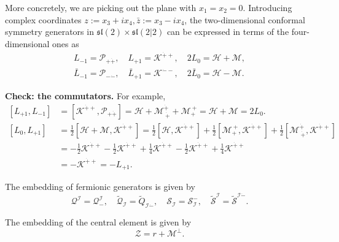 \documentclass[a4paper,11pt]{article}
\begin{document}
More concretely, we are picking out the plane with $x_1 = x_2 = 0$. Introducing complex coordinates $z := x_3 + i x_4, \bar{z} := x_3 - i x_4$, the two-dimensional conformal symmetry generators in $\mathfrak{sl}(2) \times \mathfrak{sl}(2|2)$ can be expressed in terms of the four-dimensional ones as
\begin{equation}
\begin{aligned}
    L_{-1} = \mathcal{P}_{+\dot{+}}, \quad L_{+1} = \mathcal{K}^{\dot{+}+}, \quad2 L_0 = \mathcal{H} + \mathcal{M},\\
    \bar{L}_{-1} = \mathcal{P}_{-\dot{-}}, \quad \bar{L}_{+1} = \mathcal{K}^{\dot{-}-}, \quad 2 \bar{L}_0 = \mathcal{H} - \mathcal{M}.
\end{aligned}
\end{equation}

\noindent \textbf{Check: the commutators.} For example,
\begin{equation}
\begin{aligned}
    [L_{+1}, L_{-1}] &= [\mathcal{K}^{\dot{+}+}, \mathcal{P}_{+\dot{+}}] = \mathcal{H} + \mathcal{M}^{\dot{+}}_{~ \dot{+}} + \mathcal{M}_+^{~+} = \mathcal{H} + \mathcal{M} = 2L_0.\\
    [L_0, L_{+ 1}] &= \frac{1}{2} [\mathcal{H} + \mathcal{M}, \mathcal{K}^{\dot{+}+}] = \frac{1}{2} [\mathcal{H}, \mathcal{K}^{\dot{+}+}] + \frac{1}{2}[\mathcal{M}_+^{~+}, \mathcal{K}^{\dot{+}+}] + \frac{1}{2}[\mathcal{M}^{\dot{+}}_{~\dot{+}}, \mathcal{K}^{\dot{+}+}]\\
    &= - \frac{1}{2} \mathcal{K}^{\dot{+}+} - \frac{1}{2} \mathcal{K}^{\dot{+}+} + \frac{1}{4}\mathcal{K}^{\dot{+}+} - \frac{1}{2} \mathcal{K}^{\dot{+}+} + \frac{1}{4} \mathcal{K}^{\dot{+}+}\\
    &= - \mathcal{K}^{\dot{+}+} = - L_{+1}.
\end{aligned}
\end{equation}

\bigskip
The embedding of fermionic generators is given by
\begin{equation}
    \mathcal{Q}^\mathcal{I} = \mathcal{Q}^\mathcal{I}_-, \quad \widetilde{\mathcal{Q}}_\mathcal{I} = \widetilde{Q}_{\mathcal{I} \dot{-}}, \quad \mathcal{S}_\mathcal{I} = \mathcal{S}_{\mathcal{I}}^-, \quad \widetilde{\mathcal{S}}^\mathcal{I} = \widetilde{\mathcal{S}}^{\mathcal{I} \dot{-}}.
\end{equation}

The embedding of the central element is given by
\begin{equation}
    \mathcal{Z} = r + \mathcal{M}^\perp.
\end{equation}
\end{document}
